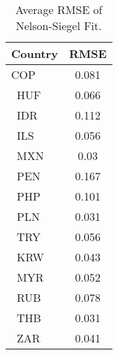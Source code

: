 \begin{table}
	\centering
	\begin{tabular}{lc}
\toprule
\textbf{Country}&\textbf{RMSE}\\\midrule
{ COP}&0.081\\\
HUF&0.066\\\
IDR&0.112\\\
ILS&0.056\\\
MXN&0.03\\\
PEN&0.167\\\
PHP&0.101\\\
PLN&0.031\\\
TRY&0.056\\\
KRW&0.043\\\
MYR&0.052\\\
RUB&0.078\\\
THB&0.031\\\
ZAR&0.041\\ \bottomrule
	\end{tabular}
	\\
	\caption{Average RMSE of Nelson-Siegel Fit.}\label{tab:rmse_ns}
\end{table}